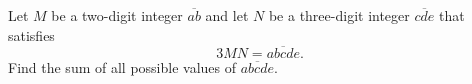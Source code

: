 Let $M$ be a two-digit integer $\overline{ab}$ and let $N$ be a three-digit integer $\overline{cde}$ that satisfies \[3MN =\overline{abcde}.\]Find the sum of all possible values of $\overline{abcde}$.
